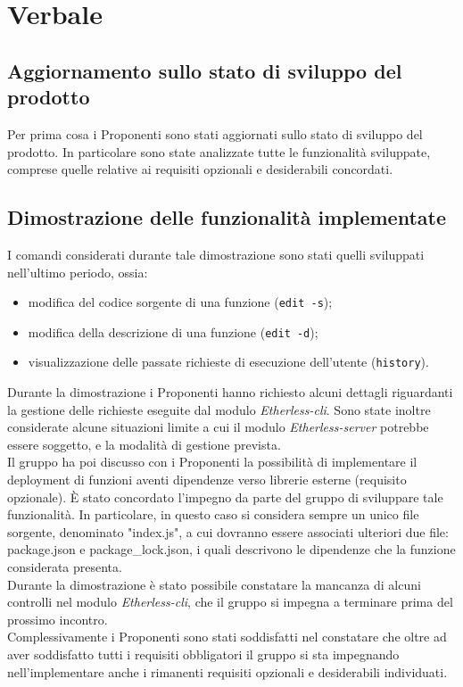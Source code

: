 \section{Verbale}
\subsection{Aggiornamento sullo stato di sviluppo del prodotto}
Per prima cosa i Proponenti sono stati aggiornati sullo stato di sviluppo del prodotto. In particolare sono state analizzate tutte le funzionalità sviluppate, comprese quelle relative ai requisiti opzionali e desiderabili concordati. 

\subsection{Dimostrazione delle funzionalità implementate}
I comandi considerati durante tale dimostrazione sono stati quelli sviluppati nell'ultimo periodo, ossia:
\begin{itemize}
	\item modifica del codice sorgente di una funzione (\texttt{edit -s}); 
	\item modifica della descrizione di una funzione (\texttt{edit -d}); 
	\item visualizzazione delle passate richieste di esecuzione dell'utente (\texttt{history}).
\end{itemize}
Durante la dimostrazione i Proponenti hanno richiesto alcuni dettagli riguardanti la gestione delle richieste eseguite dal modulo \textit{Etherless-cli}. Sono state inoltre considerate alcune situazioni limite a cui il modulo \textit{Etherless-server} potrebbe essere soggetto, e la modalità di gestione prevista. \\ 
Il gruppo ha poi discusso con i Proponenti la possibilità di implementare il deployment di funzioni aventi dipendenze verso librerie esterne (requisito opzionale). È stato concordato l'impegno da parte del gruppo di sviluppare tale funzionalità. In particolare, in questo caso si considera sempre un unico file sorgente, denominato "index.js", a cui dovranno essere associati ulteriori due file: package.json e package\_lock.json, i quali descrivono le dipendenze che la funzione considerata presenta. \\
Durante la dimostrazione è stato possibile constatare la mancanza di alcuni controlli nel modulo \textit{Etherless-cli}, che il gruppo si impegna a terminare prima del prossimo incontro. \\ 
Complessivamente i Proponenti sono stati soddisfatti nel constatare che oltre ad aver soddisfatto tutti i requisiti obbligatori il gruppo si sta impegnando nell'implementare anche i rimanenti requisiti opzionali e desiderabili individuati. 

